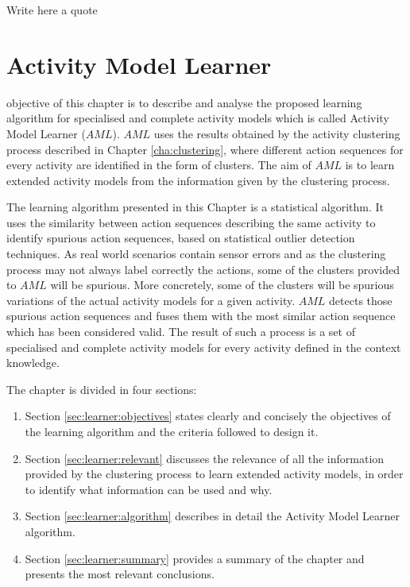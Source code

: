 

\begin{savequote}[50mm]
Write here a quote
\end{savequote}


\chapter{Activity Model Learner}
\label{cha:learner}

\ifpdf
    \graphicspath{{5_activity_model_learner/figures/PDF/}{5_activity_model_learner/figures/PNG/}{5_activity_model_learner/figures/}}
\else
    \graphicspath{{5_activity_model_learner/figures/EPS/}{5_activity_model_learner/figures/}}
\fi

 objective of this chapter is to describe and analyse the proposed learning algorithm for specialised and complete activity models which is called Activity Model Learner ($AML$). $AML$ uses the results obtained by the activity clustering process described in Chapter \ref{cha:clustering}, where different action sequences for every activity are identified in the form of clusters. The aim of $AML$ is to learn extended activity models from the information given by the clustering process.

The learning algorithm presented in this Chapter is a statistical algorithm. It uses the similarity between action sequences describing the same activity to identify spurious action sequences, based on statistical outlier detection techniques. As real world scenarios contain sensor errors and as the clustering process may not always label correctly the actions, some of the clusters provided to $AML$ will be spurious. More concretely, some of the clusters will be spurious variations of the actual activity models for a given activity. $AML$ detects those spurious action sequences and fuses them with the most similar action sequence which has been considered valid. The result of such a process is a set of specialised and complete activity models for every activity defined in the context knowledge. 

The chapter is divided in four sections:

\begin{enumerate}
 \item Section \ref{sec:learner:objectives} states clearly and concisely the objectives of the learning algorithm and the criteria followed to design it.
 \item Section \ref{sec:learner:relevant} discusses the relevance of all the information provided by the clustering process to learn extended activity models, in order to identify what information can be used and why.
 \item Section \ref{sec:learner:algorithm} describes in detail the Activity Model Learner algorithm.
 \item Section \ref{sec:learner:summary} provides a summary of the chapter and presents the most relevant conclusions.
\end{enumerate}
